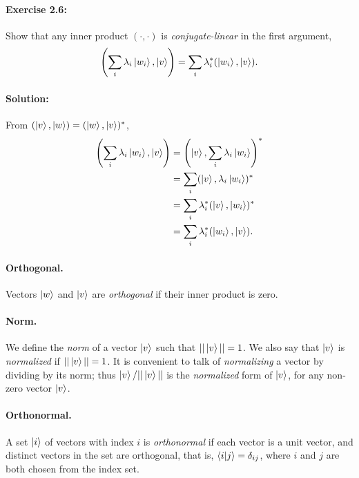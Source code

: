 \paragraph{\cite{mikeandike} Exercise 2.6:} Show that any inner product
$(\cdot, \cdot)$ is \emph{conjugate-linear} in the first argument,
\begin{equation}
  \left(\sum_i \lambda_i\ket{w_i}, \ket{v}\right)
    = \sum_i \lambda_i^*(\ket{w_i}, \ket{v}). \label{eq:conj-lin}
\end{equation}

\paragraph{Solution:} From $(\ket{v}, \ket{w}) = (\ket{w}, \ket{v})^*$,
\begin{align*}
  \left(\sum_i \lambda_i\ket{w_i}, \ket{v}\right)
    &= \left(\ket{v}, \sum_i \lambda_i\ket{w_i}\right)^* \\
    &= \sum_i (\ket{v}, \lambda_i\ket{w_i})^* \\
    &= \sum_i \lambda_i^* (\ket{v}, \ket{w_i})^* \\
    &= \sum_i \lambda_i^*(\ket{w_i}, \ket{v}).
\end{align*}

\paragraph{Orthogonal.} Vectors $\ket{w}$ and $\ket{v}$ are \emph{orthogonal}
if their inner product is zero.

\paragraph{Norm.} We define the \emph{norm} of a vector $\ket{v}$ such that
$||\ket{v}|| = 1$. We also say that $\ket{v}$ is \emph{normalized} if
$||\ket{v}|| = 1$. It is convenient to talk of \emph{normalizing} a vector by
dividing by its norm; thus $\ket{v}/||\ket{v}||$ is the \emph{normalized} form
of $\ket{v}$, for any non-zero vector $\ket{v}$.

\paragraph{Orthonormal.} A set $\ket{i}$ of vectors with index $i$ is
\emph{orthonormal} if each vector is a unit vector, and distinct vectors in the
set are orthogonal, that is, $\braket{i}{j} = \delta_{ij}$, where $i$ and $j$
are both chosen from the index set.

